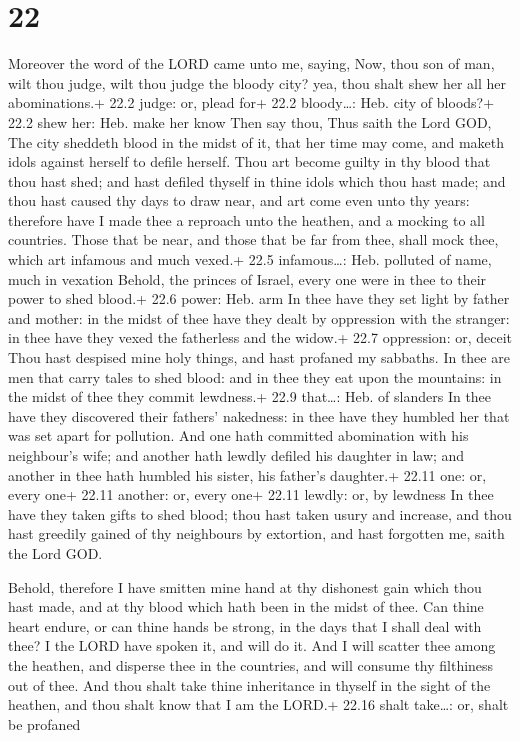 \hypertarget{section-21}{%
\section{22}\label{section-21}}

 Moreover the word of the LORD came unto me, saying,
 Now, thou son of man, wilt thou judge, wilt thou judge the
bloody city? yea, thou shalt shew her all her abominations.+ 22.2 judge:
or, plead for+ 22.2 bloody\ldots: Heb. city of bloods?+ 22.2 shew her:
Heb. make her know  Then say thou, Thus saith the Lord GOD,
The city sheddeth blood in the midst of it, that her time may come, and
maketh idols against herself to defile herself.  Thou art
become guilty in thy blood that thou hast shed; and hast defiled thyself
in thine idols which thou hast made; and thou hast caused thy days to
draw near, and art come even unto thy years: therefore have I made thee
a reproach unto the heathen, and a mocking to all countries.
 Those that be near, and those that be far from thee, shall
mock thee, which art infamous and much vexed.+ 22.5 infamous\ldots: Heb.
polluted of name, much in vexation  Behold, the princes of
Israel, every one were in thee to their power to shed blood.+ 22.6
power: Heb. arm  In thee have they set light by father and
mother: in the midst of thee have they dealt by oppression with the
stranger: in thee have they vexed the fatherless and the widow.+ 22.7
oppression: or, deceit  Thou hast despised mine holy things,
and hast profaned my sabbaths.  In thee are men that carry
tales to shed blood: and in thee they eat upon the mountains: in the
midst of thee they commit lewdness.+ 22.9 that\ldots: Heb. of slanders
 In thee have they discovered their fathers' nakedness: in
thee have they humbled her that was set apart for pollution.
 And one hath committed abomination with his neighbour's
wife; and another hath lewdly defiled his daughter in law; and another
in thee hath humbled his sister, his father's daughter.+ 22.11 one: or,
every one+ 22.11 another: or, every one+ 22.11 lewdly: or, by lewdness
 In thee have they taken gifts to shed blood; thou hast
taken usury and increase, and thou hast greedily gained of thy
neighbours by extortion, and hast forgotten me, saith the Lord GOD.

 Behold, therefore I have smitten mine hand at thy
dishonest gain which thou hast made, and at thy blood which hath been in
the midst of thee.  Can thine heart endure, or can thine
hands be strong, in the days that I shall deal with thee? I the LORD
have spoken it, and will do it.  And I will scatter thee
among the heathen, and disperse thee in the countries, and will consume
thy filthiness out of thee.  And thou shalt take thine
inheritance in thyself in the sight of the heathen, and thou shalt know
that I am the LORD.+ 22.16 shalt take\ldots: or, shalt be profaned

